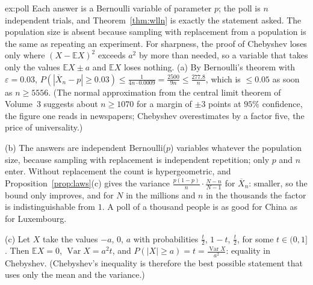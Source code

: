 \begin{solution}{ex:poll}
\idea Each answer is a Bernoulli variable of parameter $p$; the poll is $n$ independent trials, and Theorem~\ref{thm:wlln} is exactly the statement asked. The population size is absent because sampling with replacement from a population is the same as repeating an experiment. For sharpness, the proof of Chebyshev loses only where $(X-\mathbb EX)^2$ exceeds $a^2$ by more than needed, so a variable that takes only the values $\mathbb EX\pm a$ and $\mathbb EX$ loses nothing.
\writeup (a) By Bernoulli's theorem with $\varepsilon=0.03$, $P(|\overline X_n-p|\ge0.03)\le\frac1{4n\cdot0.0009}=\frac{2500}{9n}\le\frac{277.8}n$, which is $\le0.05$ as soon as $n\ge5556$. (The normal approximation from the central limit theorem of Volume~3 suggests about $n\ge1070$ for a margin of $\pm3$ points at $95\%$ confidence, the figure one reads in newspapers; Chebyshev overestimates by a factor five, the price of universality.)

(b) The answers are independent Bernoulli($p$) variables whatever the population size, because sampling with replacement is independent repetition; only $p$ and $n$ enter. Without replacement the count is hypergeometric, and Proposition~\ref{prop:laws}(c) gives the variance $\frac{p(1-p)}n\cdot\frac{N-n}{N-1}$ for $\overline X_n$: smaller, so the bound only improves, and for $N$ in the millions and $n$ in the thousands the factor is indistinguishable from $1$. A poll of a thousand people is as good for China as for Luxembourg.

(c) Let $X$ take the values $-a$, $0$, $a$ with probabilities $\frac t2$, $1-t$, $\frac t2$, for some $t\in(0,1]$. Then $\mathbb EX=0$, $\operatorname{Var}X=a^2t$, and $P(|X|\ge a)=t=\frac{\operatorname{Var}X}{a^2}$: equality in Chebyshev. (Chebyshev's inequality is therefore the best possible statement that uses only the mean and the variance.)
\end{solution}

